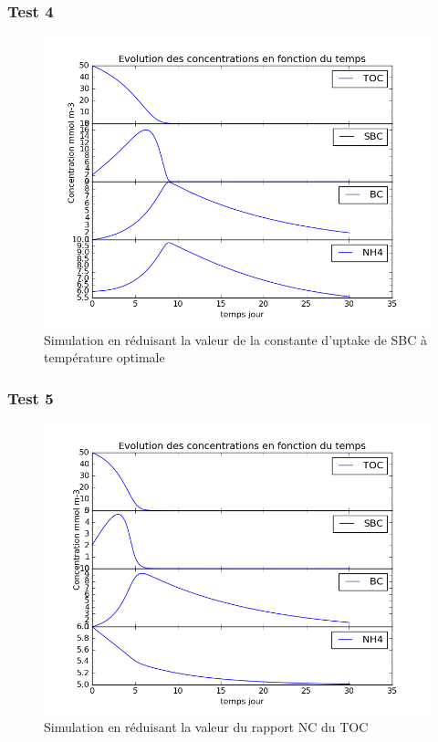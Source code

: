 \subsubsection{Test 4}

\begin{figure}[h!]
  \includegraphics[width=\textwidth]{partie1/Test4.png}
  \caption{Simulation en r\'eduisant la valeur de la constante d'uptake de SBC \`a temp\'erature optimale
  }
  \label{fig:partie1test4}
\end{figure}

\subsubsection{Test 5}


\begin{figure}[h!]
  \includegraphics[width=\textwidth]{partie1/Test5.png}
  \caption{Simulation en r\'eduisant la valeur du rapport NC du TOC
  }
  \label{fig:partie1test5}
\end{figure}

